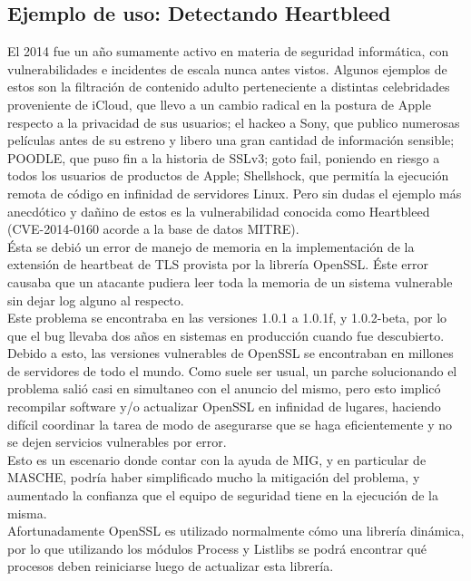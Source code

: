 \subsection{Ejemplo de uso: Detectando Heartbleed}

El 2014 fue un año sumamente activo en materia de seguridad informática, con
vulnerabilidades e incidentes de escala nunca antes vistos. Algunos ejemplos de
estos son la filtración de contenido adulto perteneciente a distintas
celebridades proveniente de iCloud, que llevo a un cambio radical en la postura
de Apple respecto a la privacidad de sus usuarios; el hackeo a Sony, que
publico numerosas películas antes de su estreno y libero una gran cantidad de
información sensible; POODLE, que puso fin a la historia de SSLv3; goto fail,
poniendo en riesgo a todos los usuarios de productos de Apple; Shellshock, que
permitía la ejecución remota de código en infinidad de servidores Linux. Pero
sin dudas el ejemplo más anecdótico y dañino de estos es la vulnerabilidad
conocida como Heartbleed (CVE-2014-0160 acorde a la base de datos MITRE).\\

Ésta se debió un error de manejo de memoria en la implementación de la extensión
de heartbeat de TLS provista por la librería OpenSSL. Éste error causaba que un
atacante pudiera leer toda la memoria de un sistema vulnerable sin dejar log
alguno al respecto.\\

Este problema se encontraba en las versiones 1.0.1 a 1.0.1f, y 1.0.2-beta, por
lo que el bug llevaba dos años en sistemas en producción cuando fue
descubierto. Debido a esto, las versiones vulnerables de OpenSSL se encontraban
en millones de servidores de todo el mundo. Como suele ser usual, un parche
solucionando el problema salió casi en simultaneo con el anuncio del mismo,
pero esto implicó recompilar software y/o actualizar OpenSSL en infinidad de
lugares, haciendo difícil coordinar la tarea de modo de asegurarse que se haga
eficientemente y no se dejen servicios vulnerables por error.\\

Esto es un escenario donde contar con la ayuda de MIG, y en particular de
MASCHE, podría haber simplificado mucho la mitigación del problema, y aumentado
la confianza que el equipo de seguridad tiene en la ejecución de la misma.\\

Afortunadamente OpenSSL es utilizado normalmente cómo una librería dinámica, por
lo que utilizando los módulos Process y Listlibs se podrá encontrar qué procesos
deben reiniciarse luego de actualizar esta librería.\\

